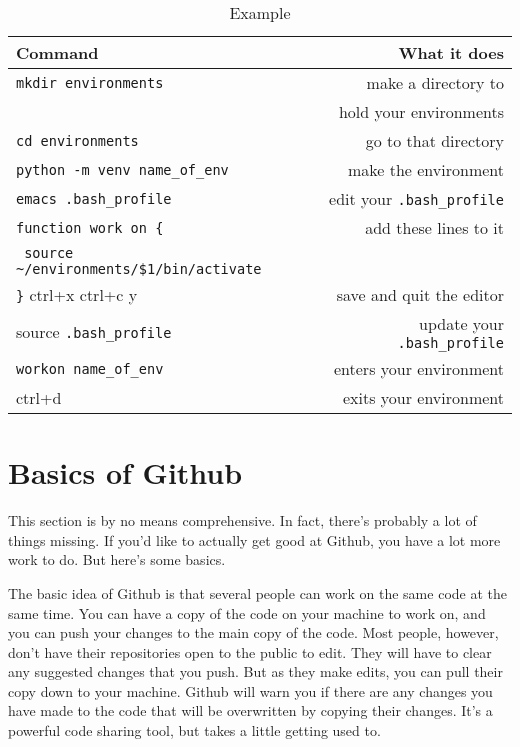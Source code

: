 \documentclass{article}
\begin{document}
\begin{table}
        \begin{center}
                \caption{Example}
                \label{venv}
                \begin{tabular}{l|r}
                  \textbf{Command} & \textbf{What it does}\\
                  \hline
                  \verb|mkdir environments| & make a directory to \\
                                   & hold your environments \\
                  \verb|cd environments| & go to that directory \\
                  \verb|python -m venv name_of_env| & make the
                                                      environment \\
                  \verb|emacs .bash_profile| & edit your
                                               \verb|.bash_profile|\\
                  \verb|function work on {| & add these lines to it \\
                  \verb| source ~/environments/$1/bin/activate| & \\
                  \verb|}|
                  ctrl+x ctrl+c y & save and quit the editor \\
                  source \verb|.bash_profile| & update your
                                                \verb|.bash_profile|\\
                  \verb|workon name_of_env| & enters your environment
                  \\
                  ctrl+d & exits your environment \\
                \end{tabular}
        \end{center}
\end{table}

\section{Basics of Github}

This section is by no means comprehensive. In fact, there's probably a
lot of things missing. If you'd like to actually get good at Github,
you have a lot more work to do. But here's some basics.

The basic idea of Github is that several people can work on the same
code at the same time. You can have a copy of the code on your machine
to work on, and you can push your changes to the main copy of the
code. Most people, however, don't have their repositories open to the
public to edit. They will have to clear any suggested changes that you
push. But as they make edits, you can pull their copy down to your
machine. Github will warn you if there are any changes you have made
to the code that will be overwritten by copying their changes. It's a
powerful code sharing tool, but takes a little getting used to. 
\end{document}
